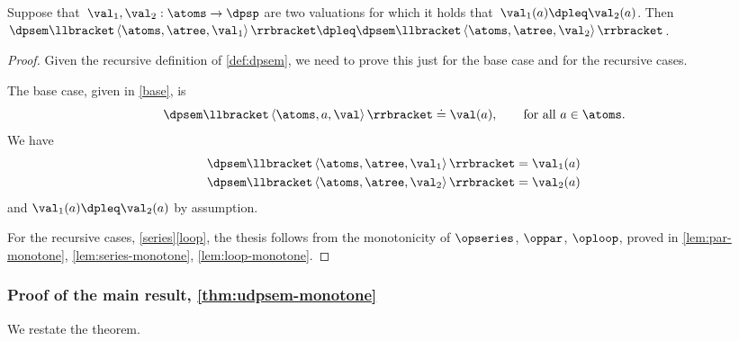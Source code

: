 \begin{lemma}
\label{lem:dpsem-monotone}Suppose that~$\val_{1},\val_{2}:\atoms\rightarrow\dpsp$
are two valuations for which it holds that~$\val_{1}(a)\dpleq\val_{2}(a)$.
Then~$\dpsem\llbracket\left\langle \atoms,\atree,\val_{1}\right\rangle \rrbracket\dpleq\dpsem\llbracket\left\langle \atoms,\atree,\val_{2}\right\rangle \rrbracket$.
\end{lemma}
\begin{proof}
Given the recursive definition of \cref{def:dpsem}, we need
to prove this just for the base case and for the recursive cases.

The base case, given in \eqref{base}, is
\[
\dpsem\llbracket\left\langle \atoms,a,\val\right\rangle \rrbracket\doteq\val(a),\qquad\text{for all}\ a\in\atoms.
\]
We have
\begin{align*}
\dpsem\llbracket\left\langle \atoms,\atree,\val_{1}\right\rangle \rrbracket & =\val_{1}(a)\\
\dpsem\llbracket\left\langle \atoms,\atree,\val_{2}\right\rangle \rrbracket & =\val_{2}(a)
\end{align*}
and $\val_{1}(a)\dpleq\val_{2}(a)$ by assumption.

For the recursive cases, \eqref{series}\textendash \eqref{loop},
the thesis follows from the monotonicity of $\opseries$, $\oppar$,
$\oploop$, proved in \cref{lem:par-monotone}, \cref{lem:series-monotone},
\cref{lem:loop-monotone}.
\end{proof}

\subsubsection{Proof of the main result, \cref{thm:udpsem-monotone}}

\label{subsec:proof-main-result}

We restate the theorem.

